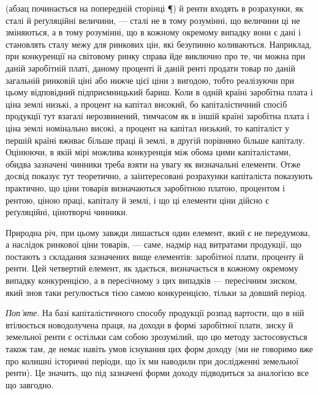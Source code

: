 \parcont{} (абзац починається на попередній сторінці ¶)
й ренти входять в розрахунки, як сталі й реґуляційні величини, — сталі не в тому
розумінні, що величини ці не зміняються, а в тому розумінні, що в кожному окремому
випадку вони є дані і становлять сталу межу для ринкових цін, які безупинно
коливаються. Наприклад, при конкуренції на світовому ринку справа
йде виключно про те, чи можна при даній заробітній платі, даному проценті й
даній ренті продати товар по даній загальній ринковій ціні або нижче цієї ціни
з вигодою, тобто реалізуючи при цьому відповідний підприємницький бариш.
Коли в одній країні заробітна плата і ціна землі низькі, а процент на капітал
високий, бо капіталістичний спосіб продукції тут взагалі нерозвинений,
тимчасом як в іншій країні заробітна плата і ціна землі номінально високі, а
процент на капітал низький, то капіталіст у першій країні вживає більше праці
й землі, в другій порівняно більше капіталу. Оцінюючи, в якій мірі можлива
конкуренція між обома цими капіталістами, обидва зазначені чинники треба
взяти на увагу як визначальні елементи. Отже досвід показує тут теоретично, а
заінтересовані розрахунки капіталіста показують практично, що ціни товарів
визначаються заробітною платою, процентом і рентою, ціною праці, капіталу
й землі, і що ці елементи ціни дійсно є реґуляційні, цінотворчі чинники.

Природна річ, при цьому завжди лишається один елемент, який є не
передумова, а наслідок ринкової ціни товарів, — саме, надмір над витратами продукції, що постають з
складання зазначених вище елементів: заробітної плати,
проценту й ренти. Цей четвертий елемент, як здається, визначається в кожному
окремому випадку конкуренцією, а в пересічному з цих випадків — пересічним
зиском, який знов таки реґулюється тією самою конкуренцією, тільки за довший
період.

\emph{Поп’яте}. На базі капіталістичного способу продукції розпад вартости, що
в ній втілюється новодолучена праця, на доходи в формі заробітної плати, зиску
й земельної ренти є остільки сам собою зрозумілий, що цю методу застосовується
також там, де немає навіть умов існування цих форм доходу (ми не говоримо
вже про колишні історичні періоди, що їх ми наводили при дослідженні
земельної ренти). Це значить, що під зазначені форми доходу підводиться за
аналогією все що завгодно.

